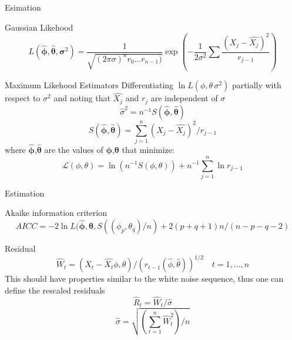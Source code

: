 \documentclass[11pt]{beamer}
\begin{document}
\begin{frame}{Esimation \cite{brockwell2002introduction}}
\small
\begin{alertblock}{Gaussian Likehood}
\begin{equation*}
L(\bm{\hat{\phi}},\bm{\hat{\theta}},\bm{\sigma}^{2})=\dfrac{1}{\sqrt{(2\pi\sigma)^{n}r_{0}...r_{n-1})}}\exp(-\dfrac{1}{2\sigma^{2}}\sum \dfrac{(X_{j}-\hat{X_{j}})^{2}}{r_{j-1}})
\end{equation*}
\end{alertblock}
\begin{alertblock}{Maximum Likehood Estimators}
Differentiating $\ln L(\phi,\theta\,\sigma^{2})$ partially with respect to $\sigma^{2}$ and noting that $\hat{X_{j}}$ and $r_{j}$ are independent of $\sigma$
\begin{equation*}
\hat{\sigma}^{2}=n^{-1}S(\bm{\hat{\phi}},\bm{\hat{\theta}})
\end{equation*}
\begin{equation*}
S(\bm{\hat{\phi}},\bm{\hat{\theta}})=\sum^{n}_{j=1}(X_{j}-\hat{X_{j}})^{2}/r_{j-1}
\end{equation*}
where $\bm{\hat{\phi}}$,$\bm{\hat{\theta}}$ are the values of $\bm{\phi}$,$\bm{\theta}$ that minimize:
\begin{equation*}
\mathcal{L}(\phi,\theta)=\ln(n^{-1}S(\phi,\theta))+n^{-1}\sum^{n}_{j=1}\ln r_{j-1}
\end{equation*}

\end{alertblock}

\end{frame}

\begin{frame}{Estimation \cite{brockwell2002introduction}}
\begin{alertblock}{Akaike information criterion}
\begin{equation*}
AICC=-2\ln L(\bm{\hat{\phi}},\bm{\hat{\theta}},S((\phi_{p},\theta_{q})/n)+2(p+q+1)n/(n-p-q-2)
\end{equation*}
\end{alertblock}
\begin{alertblock}{Residual}
\begin{equation*}
\hat{W}_{t}=\left( X_{t} -\hat{X_{t}}\phi,\theta\right)/\left(r_{t-1}( \hat{\phi},\hat{\theta})\right)^{1/2} \quad t=1,...,n 
\end{equation*}
This should have properties similar to the white noise sequence, thus one can define the rescaled residuals
\begin{equation*}
\hat{R}_{t}=\hat{W}_{t}/\hat{\sigma} 
\end{equation*}
\begin{equation*}
\hat{\sigma}=\sqrt{\left(\sum^{n}_{t=1}\hat{W}^{2}_{t}\right)/n}
\end{equation*}
\end{alertblock}
\end{frame}
\end{document}
